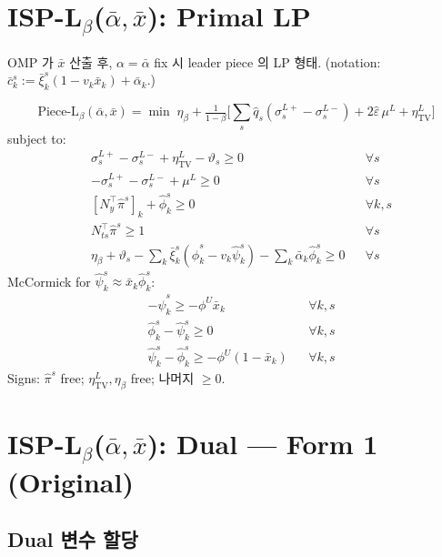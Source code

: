 \documentclass[11pt]{article}
\newcommand{\hatpi}{\hat{\pi}}
\newcommand{\hatphi}{\hat{\phi}}
\newcommand{\hatpsi}{\hat{\psi}}
\newcommand{\hatq}{\hat{q}}
\newcommand{\barxi}{\bar{\xi}}
\newcommand{\etaTV}{\eta^L_{\mathrm{TV}}}
\theoremstyle{plain}
\theoremstyle{remark}
\begin{document}
\section{ISP-L$_\beta$($\bar\alpha, \bar x$): Primal LP}
\label{sec:isp-l-primal}

OMP 가 $\bar x$ 산출 후, $\alpha = \bar\alpha$ fix 시 leader piece 의 LP 형태. (notation: $\bar c_k^s := \barxi_k^s(1-v_k\bar x_k) + \bar\alpha_k$.)

\begin{equation}\label{eq:isp-l-primal-obj}
\text{Piece-L}_\beta(\bar\alpha, \bar x) = \min\;\eta_\beta + \tfrac{1}{1-\beta}\Big[\textstyle\sum_s \hatq_s(\sigma_s^{L+} - \sigma_s^{L-}) + 2\hat\varepsilon\,\mu^L + \etaTV\Big]
\end{equation}
subject to:
\begin{align}
&\sigma_s^{L+} - \sigma_s^{L-} + \etaTV - \vartheta_s \geq 0 && \forall s \tag{EL-1C}\label{eq:EL-1C}\\
&-\sigma_s^{L+} - \sigma_s^{L-} + \mu^L \geq 0 && \forall s \tag{EL-2C}\label{eq:EL-2C}\\
&[N_y^\top \hatpi^s]_k + \hatphi_k^s \geq 0 && \forall k, s \tag{EL-3C}\label{eq:EL-3C}\\
&N_{ts}^\top \hatpi^s \geq 1 && \forall s \tag{EL-4C}\label{eq:EL-4C}\\
&\eta_\beta + \vartheta_s - \textstyle\sum_k \barxi_k^s(\hatphi_k^s - v_k\hatpsi_k^s) - \sum_k \bar\alpha_k \hatphi_k^s \geq 0 && \forall s \tag{EL-5C}\label{eq:EL-5C}
\end{align}
McCormick for $\hatpsi_k^s \approx \bar x_k \hatphi_k^s$:
\begin{align}
&-\hatpsi_k^s \geq -\phi^U \bar x_k && \forall k, s \tag{EL-McC1}\label{eq:McC1}\\
&\hatphi_k^s - \hatpsi_k^s \geq 0 && \forall k, s \tag{EL-McC2}\label{eq:McC2}\\
&\hatpsi_k^s - \hatphi_k^s \geq -\phi^U(1-\bar x_k) && \forall k, s \tag{EL-McC3}\label{eq:McC3}
\end{align}
Signs: $\hatpi^s$ free; $\etaTV, \eta_\beta$ free; 나머지 $\geq 0$.


\section{ISP-L$_\beta$($\bar\alpha, \bar x$): Dual --- Form 1 (Original)}
\label{sec:isp-l-dual-orig}

\subsection{Dual 변수 할당}
\end{document}
